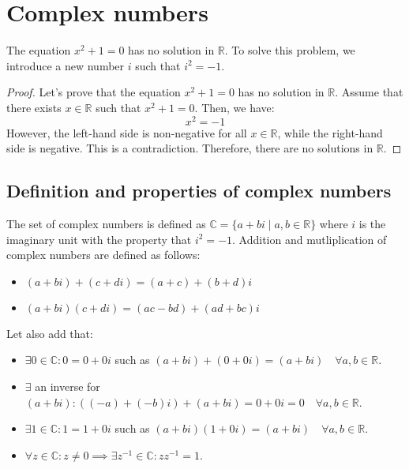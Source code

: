 \chapter{Complex numbers}
The equation $x^2 + 1 = 0$ has no solution in $\mathbb{R}$. To solve this problem, we introduce a new number $i$ such that $i^2 = -1$.
\begin{proof}
    Let's prove that the equation $x^2 + 1 = 0$ has no solution in $\mathbb{R}$.
    Assume that there exists $x \in \mathbb{R}$ such that $x^2 + 1 = 0$. Then, we have:
    \[
        x^2 = -1
    \]
    However, the left-hand side is non-negative for all $x \in \mathbb{R}$, while the right-hand side is negative. This is a contradiction. Therefore, there are no solutions in $\mathbb{R}$.
\end{proof}

\section{Definition and properties of complex numbers}
\begin{definition}
    The set of complex numbers is defined as $\mathbb{C} = \{ a + bi \mid a, b \in \mathbb{R} \}$ where $i$ is the imaginary unit with the property that $i^2 = -1$. Addition and mutliplication of complex numbers are defined as follows:
    \begin{itemize}[itemsep=1pt,label=$\circ$]
        \item $(a + bi) + (c + di) = (a + c) + (b + d)i$
        \item $(a + bi)(c + di) = (ac - bd) + (ad + bc)i$
    \end{itemize}
\end{definition}
Let also add that:
\begin{itemize}[itemsep=1pt,label=$\circ$]
    \item $\exists 0 \in \mathbb{C}: 0 = 0 + 0i$ such as $(a + bi) + (0 + 0i) = (a + bi) \quad \forall a, b \in \mathbb{R}$.
    \item $\exists$ an inverse for $(a + bi): ((-a) + (-b)i) + (a + bi) = 0 + 0i = 0 \quad \forall a, b \in \mathbb{R}$.
    \item $\exists 1 \in \mathbb{C}: 1 = 1 + 0i$ such as $(a + bi)(1 + 0i) = (a + bi) \quad \forall a, b \in \mathbb{R}$.
    \item $\forall z \in \mathbb{C} : z \neq 0 \implies \exists z^{-1} \in \mathbb{C} : z z^{-1} = 1$.
\end{itemize}


